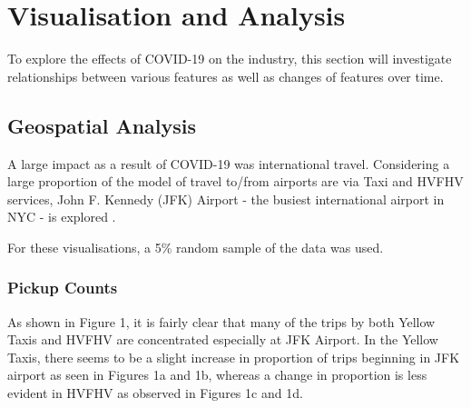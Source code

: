 \documentclass[11pt]{article}
\begin{document}
\section{Visualisation and Analysis}
To explore the effects of COVID-19 on the industry, this section will investigate relationships between various features as well as changes of features over time. 

\subsection{Geospatial Analysis}
A large impact as a result of COVID-19 was international travel. Considering a large proportion of the model of travel to/from airports are via Taxi and HVFHV services, John F. Kennedy (JFK) Airport - the busiest international airport in NYC - is explored \cite{JFK_airport}.

For these visualisations, a 5\% random sample of the data was used.

\subsubsection{Pickup Counts}

As shown in Figure 1, it is fairly clear that many of the trips by both Yellow Taxis and HVFHV are concentrated especially at JFK Airport. In the Yellow Taxis, there seems to be a slight increase in proportion of trips beginning in JFK airport as seen in Figures 1a and 1b, whereas a change in proportion is less evident in HVFHV as observed in Figures 1c and 1d. 
\end{document}
